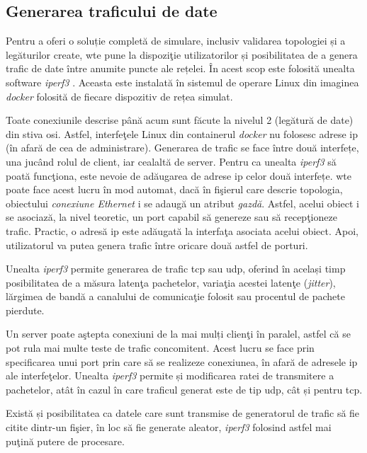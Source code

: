 \subsection{Generarea traficului de date}

Pentru a oferi o soluție completă de simulare, inclusiv validarea topologiei și a legăturilor create, \gls{wte} pune la dispoziţie utilizatorilor și posibilitatea de a genera trafic de date între anumite puncte ale rețelei. În acest scop este folosită unealta software \textit{iperf3} \cite{iperf32017, tirumala2005iperf}. Aceasta este instalată în sistemul de operare Linux din imaginea \textit{docker} folosită de fiecare dispozitiv de rețea simulat.

Toate conexiunile descrise până acum sunt făcute la nivelul 2 (legătură de date) din stiva \gls{osi}. Astfel, interfeţele Linux din containerul \textit{docker} nu folosesc adrese \gls{ip} (în afară de cea de administrare). Generarea de trafic se face între două interfețe, una jucând rolul de client, iar cealaltă de server. Pentru ca unealta \textit{iperf3} să poată funcţiona, este nevoie de adăugarea de adrese \gls{ip} celor două interfețe. \gls{wte} poate face acest lucru în mod automat, dacă în fişierul care descrie topologia, obiectului \textit{conexiune Ethernet} i se adaugă un atribut \textit{gazdă}. Astfel, acelui obiect i se asociază, la nivel teoretic, un port capabil să genereze sau să recepţioneze trafic. Practic, o adresă \gls{ip} este adăugată la interfaţa asociata acelui obiect. Apoi, utilizatorul va putea genera trafic între oricare două astfel de porturi. 

Unealta \textit{iperf3} permite generarea de trafic \gls{tcp} sau \gls{udp}, oferind în același timp posibilitatea de a măsura latenţa pachetelor, variaţia acestei latenţe (\textit{jitter}), lărgimea de bandă a canalului de comunicaţie folosit sau procentul de pachete pierdute.

Un server poate aştepta conexiuni de la mai mulți clienţi în paralel, astfel că se pot rula mai multe teste de trafic concomitent. Acest lucru se face prin specificarea unui port prin care să se realizeze conexiunea, în afară de adresele \gls{ip} ale interfeţelor. Unealta \textit{iperf3} permite și modificarea ratei de transmitere a pachetelor, atât în cazul în care traficul generat este de tip \gls{udp}, cât și pentru \gls{tcp}.

Există și posibilitatea ca datele care sunt transmise de generatorul de trafic să fie citite dintr-un fişier, în loc să fie generate aleator, \textit{iperf3} folosind astfel mai puţină putere de procesare.

